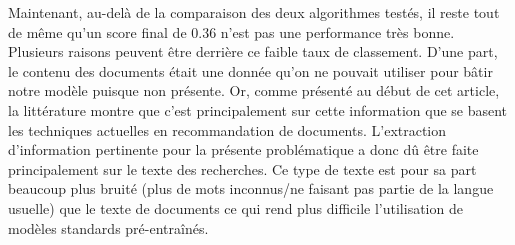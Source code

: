 \break

Maintenant, au-delà de la comparaison des deux algorithmes testés, il reste tout de même qu'un score final de 0.36 n'est pas une performance très bonne.
Plusieurs raisons peuvent être derrière ce faible taux de classement. 
D'une part, le contenu des documents était une donnée qu'on ne pouvait utiliser pour bâtir notre modèle puisque non présente.
Or, comme présenté au début de cet article, la littérature montre que c'est principalement sur cette information que se basent les techniques actuelles en recommandation de documents. 
L'extraction d'information pertinente pour la présente problématique a donc dû être faite principalement sur le texte des recherches. 
Ce type de texte est pour sa part beaucoup plus bruité (plus de mots inconnus/ne faisant pas partie de la langue usuelle) que le texte de documents ce qui rend plus difficile l'utilisation de modèles standards pré-entraînés.
